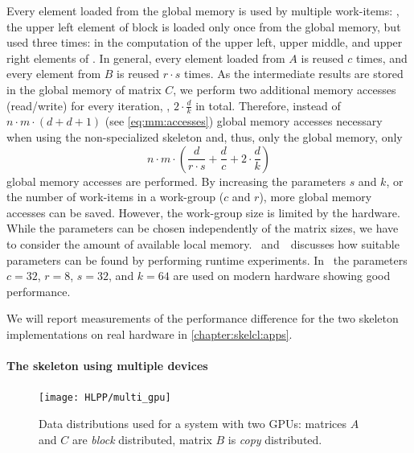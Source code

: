 Every element loaded from the global memory is used by multiple work-items:
\eg, the upper left element of block  is loaded only once from the global memory, but used three times:
in the computation of the upper left, upper middle, and upper right elements of .
In general, every element loaded from $A$ is reused $c$ times, and every element from $B$ is reused $r\cdot s$ times.
As the intermediate results are stored in the global memory of matrix $C$, we perform two additional memory accesses (read/write) for every iteration, \ie, $2\cdot \frac{d}{k}$ in total.
Therefore, instead of $n\cdot m\cdot (d + d + 1)$ (see \autoref{eq:mm:accesses}) global memory accesses necessary when using the non-specialized skeleton and, thus, only the global memory, only
\begin{equation}
  n\cdot m\cdot (\frac{d}{r\cdot s} + \frac{d}{c} + 2\cdot \frac{d}{k})
\end{equation}
global memory accesses are performed.
By increasing the parameters $s$ and $k$, or the number of work-items in a work-group ($c$ and $r$), more global memory accesses can be saved.
However, the work-group size is limited by the \GPU hardware.
While the parameters can be chosen independently of the matrix sizes, we have to consider the amount of available local memory.
\cite{Friese2013}~and~\cite{SarjeAl2013}~discusses how suitable parameters can be found by performing runtime experiments.
In~\cite{Friese2013} the parameters $c = 32$, $r=8$, $s=32$, and $k=64$ are used on modern \GPU hardware showing good performance.

We will report measurements of the performance difference for the two skeleton implementations on real hardware in \autoref{chapter:skelcl:apps}.

\paragraph{The \allpairs skeleton using multiple devices}
\label{sec:allpairs:multi_gpu}
\begin{figure}[b]
  \centering
  \texttt{[image: HLPP/multi\_gpu]}
  \caption{Data distributions used for a system with two GPUs: matrices $A$ and $C$ are \emph{block} distributed, matrix $B$ is \emph{copy} distributed.}
  \label{fig:multi_gpu}
\end{figure}

